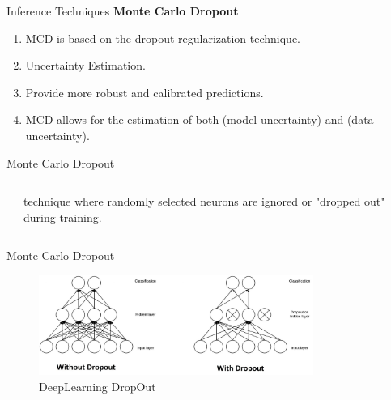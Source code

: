 \documentclass[aspectratio=169,xcolor=dvipsnames, t]{beamer}
\begin{document}
\begin{frame}{Inference Techniques}
\textbf{Monte Carlo Dropout}
     \begin{enumerate}
        \item MCD is based on the dropout regularization technique.
        \item Uncertainty Estimation.
        \item Provide more robust and calibrated predictions.
        \item MCD allows for the estimation of both (model uncertainty) and (data uncertainty).
    \end{enumerate}
\end{frame}


\begin{frame}{Monte Carlo Dropout}
    \begin{columns}
    \begin{column}{0.45\textwidth}
       
    \end{column}
    \begin{column}{0.45\textwidth}  %
        technique where randomly selected neurons are ignored or "dropped out" during training.
    \end{column}
    \end{columns}
\end{frame}

\begin{frame}{Monte Carlo Dropout}
\begin{figure}
        \centering
        \includegraphics[width=0.8\textwidth,height=0.8\textheight,keepaspectratio]{images/dropout.jpg}
        \caption{DeepLearning  DropOut}
    \end{figure}
  
\end{frame}
\end{document}
